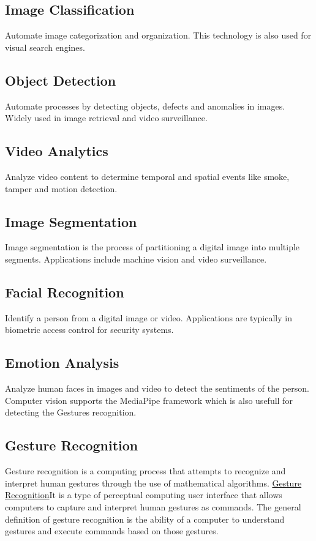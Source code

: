 \subsection{Image Classification}

Automate image categorization and organization. This technology is also used for visual search engines.

\subsection{Object Detection}

Automate processes by detecting objects, defects and anomalies in images. Widely used in image retrieval and video surveillance.

\subsection{Video Analytics}

Analyze video content to determine temporal and spatial events like smoke, tamper and motion detection.

\subsection{Image Segmentation}

Image segmentation is the process of partitioning a digital image into multiple segments. Applications include machine vision and video surveillance.

\subsection{Facial Recognition}

Identify a person from a digital image or video. Applications are typically in biometric access control for security systems.

\subsection{Emotion Analysis}

Analyze human faces in images and video to detect the sentiments of the person. Computer vision supports the MediaPipe framework which is also usefull for detecting the Gestures recognition. 


\subsection{Gesture Recognition}

Gesture recognition is a computing process that attempts to recognize and interpret human gestures through the use of mathematical algorithms. \href{https://www.marxentlabs.com/what-is-gesture-recognition-defined/}{Gesture Recognition}It is a type of perceptual computing user interface that allows computers to capture and interpret human gestures as commands. The general definition of gesture recognition is the ability of a computer to understand gestures and execute commands based on those gestures.  

